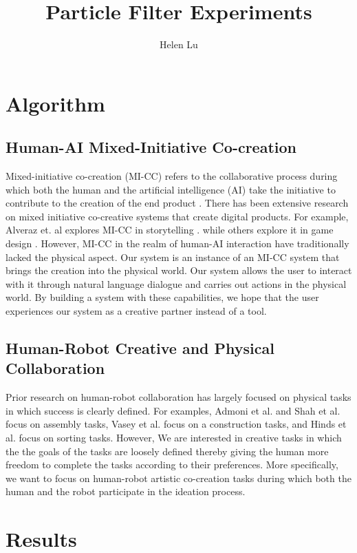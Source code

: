 \documentclass{article}
\begin{document}
\title{Particle Filter Experiments}
\author{Helen Lu}
\maketitle


\section{Algorithm}
\subsection{Human-AI Mixed-Initiative Co-creation}
Mixed-initiative co-creation (MI-CC) refers to the collaborative process during which both the human and the artificial intelligence (AI) take the initiative to contribute to the creation of the end product \cite{yannakakis_mixed-initiative_nodate}. There has been extensive research on mixed initiative co-creative systems that create digital products. For example, Alveraz et. al explores MI-CC in storytelling \cite{alvarez_story_2022}. while others explore it in game design \cite{liapis_can_2016}. However, MI-CC in the realm of human-AI interaction have traditionally lacked the physical aspect. Our system is an instance of an MI-CC system that brings the creation into the physical world. Our system allows the user to interact with it through natural language dialogue and carries out actions in the physical world. By building a system with these capabilities, we hope that the user experiences our system as a creative partner instead of a tool.
\subsection{Human-Robot Creative and Physical Collaboration}
Prior research on human-robot collaboration has largely focused on physical tasks in which success is clearly defined. For examples, Admoni et al. \cite{admoni_robot_2016} and Shah et al. \cite{shah_improved_2011} focus on assembly tasks, Vasey et al. \cite{vasey_collaborative_2016} focus on a construction tasks, and Hinds et al. \cite{hinds_whose_2004} focus on sorting tasks. However, We are interested in creative tasks in which the the goals of the tasks are loosely defined thereby giving the human more freedom to complete the tasks according to their preferences. More specifically, we want to focus on human-robot artistic co-creation tasks during which both the human and the robot participate in the ideation process.

\section{Results}
\end{document}
